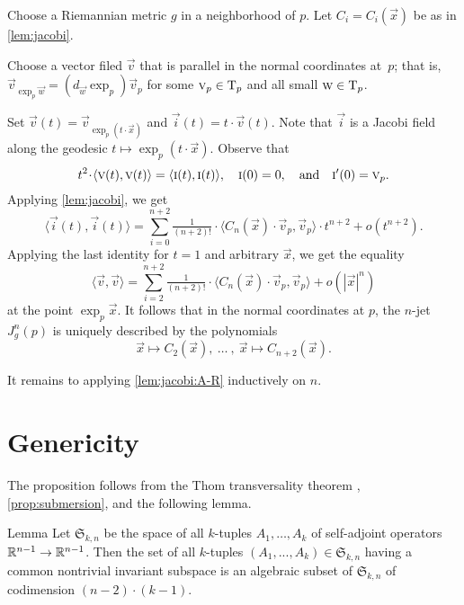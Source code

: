 \documentclass[a4paper,10pt]{article}
\begin{document}
Choose a Riemannian metric $g$ in a neighborhood of $p$.
Let $C_i=C_i(\vec{x})$ be as in \ref{lem:jacobi}.

Choose a vector filed $\vec{v}$ that is parallel in the normal coordinates at~$p$;
that is, $\vec{v}_{\exp_p\vec{w}}=(d_\vec{w}\exp_p)\vec{v}_p$ for some $\text{\sc{v}}_p\in\mathrm{T}_p$ and all small $\text{\sc{w}}\in \mathrm{T}_p$.

Set $\vec{v}(t)=\vec{v}_{\exp_p(t\cdot \vec{x})}$ and $\vec{i}(t)=t\cdot \vec{v}(t)$.
Note that $\vec{i}$ is a Jacobi field along the geodesic $t\mapsto \exp_p(t\cdot \vec{x})$.
Observe that 
\[t^2\cdot \langle \vec{v}(t),
\vec{v}(t)\rangle=\langle \vec{i}(t), \vec{i}(t)\rangle,
\quad 
\vec{i}(0)=0,
\quad 
\text{and} \quad 
\vec{i}'(0)\z=\vec{v}_p.\]
Applying \ref{lem:jacobi}, we get
\[\langle\vec{i}(t), \vec{i}(t)\rangle=\sum_{i=0}^{n+2}\tfrac1{(n+2)!}\cdot\langle C_n(\vec{x})\cdot \vec{v}_p,\vec{v}_p\rangle\cdot t^{n+2}+o(t^{n+2}).\]
Applying the last identity for $t=1$ and arbitrary $\vec{x}$, we get the equality
\[\langle\vec{v}, \vec{v}\rangle=\sum_{i=2}^{n+2}\tfrac1{(n+2)!}\cdot\langle C_n(\vec{x})\cdot \vec{v}_p,\vec{v}_p\rangle+o(|\vec{x}|^{n})\]
at the point $\exp_p \vec{x}$.
It follows that in the normal coordinates at $p$,
the $n$-jet $J^n_g(p)$ is uniquely described by the polynomials
\[\vec{x}\mapsto C_2(\vec{x}),
\ \dots\ ,\  
\vec{x}\mapsto C_{n+2}(\vec{x}).\]

It remains to applying \ref{lem:jacobi:A-R} inductively on $n$.
\qeds 

\section{Genericity}



The proposition follows from the Thom transversality theorem \cite[2.3.2]{eliashberg-mishachev}, \ref{prop:submersion}, and the following lemma.


\begin{thm}{Lemma}
Let $\mathfrak{S}_{k,n}$ be the space of all $k$-tuples $A_1,\dots, A_k$ of self-adjoint operators $\mathbb{R}^{n-1}\to\mathbb{R}^{n-1}$.
Then the set of all $k$-tuples $(A_1,...,A_k) \in \mathfrak{S}_{k,n}$ having a common nontrivial invariant subspace is an algebraic subset of $\mathfrak{S}_{k,n}$ of codimension $(n-2)\cdot (k-1)$.
\end{thm}

\qeds




\end{document}
